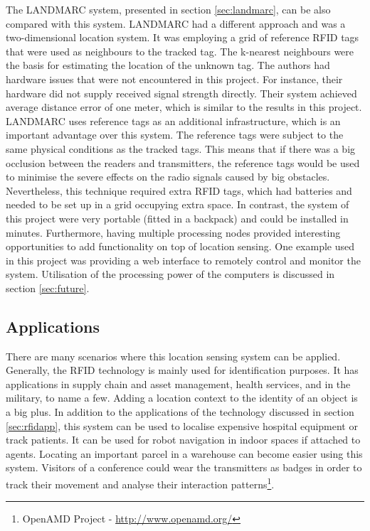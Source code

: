 The LANDMARC system, presented in section \ref{sec:landmarc}, can be also compared with this system. LANDMARC had a different approach and was a two-dimensional location system. It was employing a grid of reference RFID tags that were used as neighbours to the tracked tag. The k-nearest neighbours were the basis for estimating the location of the unknown tag. The authors had hardware issues that were not encountered in this project. For instance, their hardware did not supply received signal strength directly. Their system achieved average distance error of one meter, which is similar to the results in this project. LANDMARC uses reference tags as an additional infrastructure, which is an important advantage over this system. The reference tags were subject to the same physical conditions as the tracked tags. This means that if there was a big occlusion between the readers and transmitters, the reference tags would be used to minimise the severe effects on the radio signals caused by big obstacles. Nevertheless, this technique required extra RFID tags, which had batteries and needed to be set up in a grid occupying extra space. In contrast, the system of this project were very portable (fitted in a backpack) and could be installed in minutes. Furthermore, having multiple processing nodes provided interesting opportunities to add functionality on top of location sensing. One example used in this project was providing a web interface to remotely control and monitor the system. Utilisation of the processing power of the computers is discussed in section \ref{sec:future}.

\subsection{Applications}

There are many scenarios where this location sensing system can be applied. Generally, the RFID technology is mainly used for identification purposes. It has applications in supply chain and asset management, health services, and in the military, to name a few. Adding a location context to the identity of an object is a big plus. In addition to the applications of the technology discussed in section \ref{sec:rfidapp}, this system can be used to localise expensive hospital equipment or track patients. It can be used for robot navigation in indoor spaces if attached to agents. Locating an important parcel in a warehouse can become easier using this system. Visitors of a conference could wear the transmitters as badges in order to track their movement and analyse their interaction patterns\footnote{OpenAMD Project - \url{http://www.openamd.org/}}.

